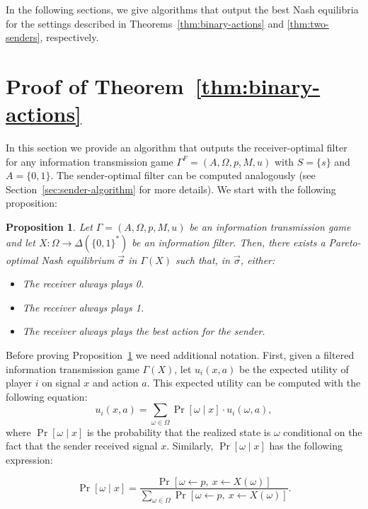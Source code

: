 \documentclass[submission,copyright,creativecommons]{eptcs}
\newtheorem{proposition}{Proposition}
\begin{document}
In the following sections, we give algorithms that output the best Nash equilibria for the settings described in Theorems~\ref{thm:binary-actions} and \ref{thm:two-senders}, respectively. 


\section{Proof of Theorem~\ref{thm:binary-actions}}\label{sec:proof-1-sender}

In this section we provide an algorithm that outputs the receiver-optimal filter for any information transmission game $\Gamma^{F} = (A, \Omega, p, M, u)$ with $S = \{s\}$ and $A = \{0,1\}$. The sender-optimal filter can be computed analogously (see Section~\ref{sec:sender-algorithm} for more details). We start with the following proposition:

\begin{proposition}\label{prop:characterization1}
Let $\Gamma = (A, \Omega, p, M, u)$ be an information transmission game and let $X: \Omega \to \Delta(\{0,1\}^*)$ be an information filter. Then, there exists a Pareto-optimal Nash equilibrium $\vec{\sigma}$ in $\Gamma(X)$ such that, in $\vec{\sigma}$, either:
\begin{itemize}
    \item The receiver always plays 0.
    \item The receiver always plays 1.
    \item The receiver always plays the best action for the sender.
\end{itemize}
\end{proposition}


Before proving Proposition~\ref{prop:characterization1} we need additional notation. 
First, given a filtered information transmission game $\Gamma(X)$, let $u_i(x, a)$ be the expected utility of player $i$ on signal $x$ and action $a$. This expected utility can be computed with the following equation:
$$u_i(x,a) = \sum_{\omega \in \Omega} \Pr[\omega \mid x] \cdot u_i(\omega, a),$$
where $\Pr[\omega \mid x]$ is the probability that the realized state is $\omega$ conditional on the fact that the sender received signal $x$. Similarly, $\Pr[\omega \mid x]$ has the following expression:

$$
\Pr[\omega \mid x] = \frac{\Pr[\omega \longleftarrow p, \ x \longleftarrow X(\omega)]}{\sum_{\omega \in \Omega} \Pr[\omega \longleftarrow p,\  x \longleftarrow X(\omega)]}.
$$
\end{document}
